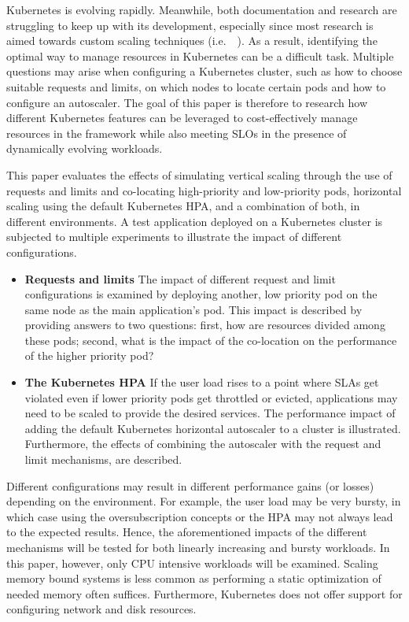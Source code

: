 Kubernetes is evolving rapidly. Meanwhile, both documentation and research are struggling to keep up with its development, especially since most research is aimed towards custom scaling techniques (i.e.~\citep{hyscale}~\citep{caravel}). As a result, identifying the optimal way to manage resources in Kubernetes can be a difficult task. Multiple questions may arise when configuring a Kubernetes cluster, such as how to choose suitable requests and limits, on which nodes to locate certain pods and how to configure an autoscaler. 
The goal of this paper is therefore to research how different Kubernetes features can be leveraged to cost-effectively manage resources in the framework while also meeting SLOs in the presence of dynamically evolving workloads. 

This paper evaluates the effects of simulating vertical scaling through the use of requests and limits and co-locating high-priority and low-priority pods, horizontal scaling using the default Kubernetes HPA, and a combination of both, in different environments. A test application deployed on a Kubernetes cluster is subjected to multiple experiments to illustrate the impact of different configurations.

\begin{itemize}
    \item \textbf{Requests and limits}
    The impact of different request and limit configurations is examined by deploying another, low priority pod on the same node as the main application's pod. This impact is described by providing answers to two questions: first, how are resources divided among these pods; second, what is the impact of the co-location on the performance of the higher priority pod?     
		\item \textbf{The Kubernetes HPA}
    If the user load rises to a point where SLAs get violated even if lower priority pods get throttled or evicted, applications may need to be scaled to provide the desired services. The performance impact of adding the default Kubernetes horizontal autoscaler to a cluster is illustrated. Furthermore, the effects of combining the autoscaler with the request and limit mechanisms, are described.
\end{itemize}

Different configurations may result in different performance gains (or losses) depending on the environment. For example, the user load may be very bursty, in which case using the oversubscription concepts or the HPA may not always lead to the expected results. Hence, the aforementioned impacts of the different mechanisms will be tested for both linearly increasing and bursty workloads. In this paper, however, only CPU intensive workloads will be examined. Scaling memory bound systems is less common as performing a static optimization of needed memory often suffices. Furthermore, Kubernetes does not offer support for configuring network and disk resources.

